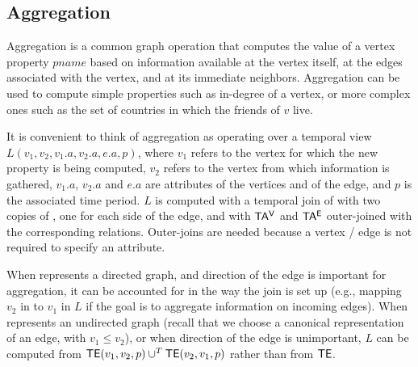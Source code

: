\subsection{Aggregation}
\label{sec:algebra:agg}

Aggregation is a common graph operation that computes the value of a
vertex property $pname$ based on information available at the vertex
itself, at the edges associated with the vertex, and at its immediate
neighbors.  Aggregation can be used to compute simple properties such
as in-degree of a vertex, or more complex ones such as the set of
countries in which the friends of $v$ live.

It is convenient to think of aggregation as operating over a temporal
view $L(v_1,v_2,v_1.a,v_2.a,e.a,p)$, where $v_1$ refers to the vertex
for which the new property is being computed, $v_2$ refers to the
vertex from which information is gathered, $v_1.a$, $v_2.a$ and $e.a$
are attributes of the vertices and of the edge, and $p$ is the
associated time period.  $L$ is computed with a temporal join of \te
with two copies of \tv, one for each side of the edge, and with $\mathsf{TA^{V}}$
and $\mathsf{TA^{E}}$ outer-joined with the corresponding relations.  Outer-joins
are needed because a vertex / edge is not required to specify an
attribute.

When \tve represents a directed graph, and direction of the edge is
important for aggregation, it can be accounted for in the way the join
is set up (e.g., mapping $v_2$ in \te to $v_1$ in $L$ if the goal is
to aggregate information on incoming edges).  When \tve represents an
undirected graph (recall that we choose a canonical representation of
an edge, with $v_1 \leq v_2$), or when direction of the edge is
unimportant, $L$ can be computed from $\textsf{TE}(v_1,v_2,p) \cup^T
\textsf{TE}(v_2,v_1,p)$ rather than from $\textsf{TE}$.

